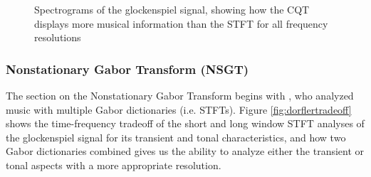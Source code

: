 \documentclass[report.tex]{subfiles}
\begin{document}
\begin{figure}[ht]
	\caption{Spectrograms of the glockenspiel signal, showing how the CQT displays more musical information than the STFT for all frequency resolutions}
	\label{fig:cqtvstft}
\end{figure}

\newpagefill

\subsubsection{Nonstationary Gabor Transform (NSGT)}
\label{sec:theorynsgt}

The section on the Nonstationary Gabor Transform begins with \textcite{doerflerphd}, who analyzed music with multiple Gabor dictionaries (i.e. STFTs). Figure \ref{fig:dorflertradeoff} shows the time-frequency tradeoff of the short and long window STFT analyses of the glockenspiel signal for its transient and tonal characteristics, and how two Gabor dictionaries combined gives us the ability to analyze either the transient or tonal aspects with a more appropriate resolution.
\end{document}
